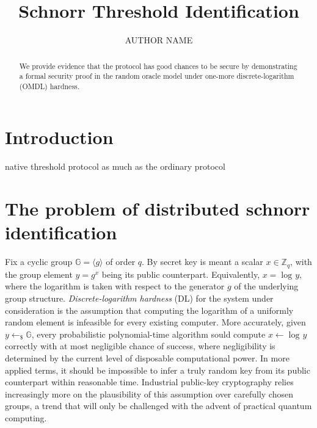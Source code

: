 \documentclass[psamsfonts, reqno]{amsart}
\title{Schnorr Threshold Identification}
\author{AUTHOR NAME}
\theoremstyle{definition}
\theoremstyle{remark}
\numberwithin{equation}{section}
\begin{document}
\begin{abstract}

We provide evidence that the protocol has good chances to
be secure
by demonstrating
a formal security proof
in the random oracle model
under one-more discrete-logarithm (OMDL) hardness.

\end{abstract}

\maketitle


\section{Introduction}

native threshold protocol as much as the ordinary protocol

\section{The problem of distributed schnorr identification}

\noindent
Fix a cyclic group $\mathbb{G} = \langle g \rangle$ of order $q$.
By secret key is meant a scalar $x \in \mathbb{Z}_q$,
with the group element $y = g ^ x$
being its public counterpart.
Equivalently, $x = \log\hspace{1pt} y$,
where the logarithm is taken with respect to the
generator $g$ of the underlying group structure.
\textit{Discrete-logarithm hardness} (DL) for
the system under consideration
is the assumption that computing the logarithm of
a uniformly random element is infeasible
for every existing computer.
More accurately, given $y \leftarrow_\$ \mathbb{G}$,
every probabilistic polynomial-time algorithm
sould compute $x \leftarrow \log\hspace{1pt} y$ correctly
with at most negligible chance of success,
where negligibility is determined by
the current level of disposable computational power.
In more applied terms, it should be impossible to infer
a truly random key from its public counterpart
within reasonable time.
Industrial public-key cryptography relies increasingly more
on the plausibility of this assumption over
carefully chosen groups, a trend that will
only be challenged with the advent of practical quantum computing.
\end{document}
